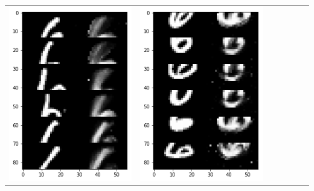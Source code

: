 \documentclass[12pt]{report} %
\begin{document}
\begin{tabular}{m{0.7cm}m{2.4cm}m{2.4cm}m{2.4cm}m{2.4cm}m{2.4cm}m{2.4cm}}
\includegraphics[scale=0.3]{pictures/M1_6_up.png} & \includegraphics[scale=0.3]{pictures/M1_6_down.png} &

\end{tabular}
\end{document}
